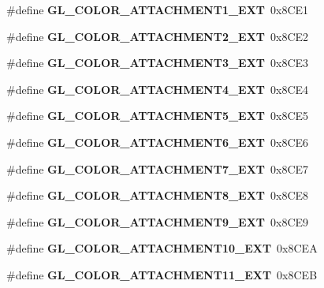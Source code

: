 \begin{DoxyCompactItemize}
\item 
\#define {\bfseries G\+L\+\_\+\+C\+O\+L\+O\+R\+\_\+\+A\+T\+T\+A\+C\+H\+M\+E\+N\+T1\+\_\+\+E\+X\+T}~0x8\+C\+E1\label{_s_d_l__opengl_8h_abb41a580a48b0db9ab09bd666b197c38}

\item 
\#define {\bfseries G\+L\+\_\+\+C\+O\+L\+O\+R\+\_\+\+A\+T\+T\+A\+C\+H\+M\+E\+N\+T2\+\_\+\+E\+X\+T}~0x8\+C\+E2\label{_s_d_l__opengl_8h_ae095e9224b140740da4120b4df6ee383}

\item 
\#define {\bfseries G\+L\+\_\+\+C\+O\+L\+O\+R\+\_\+\+A\+T\+T\+A\+C\+H\+M\+E\+N\+T3\+\_\+\+E\+X\+T}~0x8\+C\+E3\label{_s_d_l__opengl_8h_a5e1b0f6369ed1fec16d1a6a30f27b3e8}

\item 
\#define {\bfseries G\+L\+\_\+\+C\+O\+L\+O\+R\+\_\+\+A\+T\+T\+A\+C\+H\+M\+E\+N\+T4\+\_\+\+E\+X\+T}~0x8\+C\+E4\label{_s_d_l__opengl_8h_af6d67cab75dc9104ce5d26351a8df930}

\item 
\#define {\bfseries G\+L\+\_\+\+C\+O\+L\+O\+R\+\_\+\+A\+T\+T\+A\+C\+H\+M\+E\+N\+T5\+\_\+\+E\+X\+T}~0x8\+C\+E5\label{_s_d_l__opengl_8h_ab6cf2e09b26e4c491520a6ab2db51a25}

\item 
\#define {\bfseries G\+L\+\_\+\+C\+O\+L\+O\+R\+\_\+\+A\+T\+T\+A\+C\+H\+M\+E\+N\+T6\+\_\+\+E\+X\+T}~0x8\+C\+E6\label{_s_d_l__opengl_8h_a57887f8f8eb2e0d40123a5be0d6618a2}

\item 
\#define {\bfseries G\+L\+\_\+\+C\+O\+L\+O\+R\+\_\+\+A\+T\+T\+A\+C\+H\+M\+E\+N\+T7\+\_\+\+E\+X\+T}~0x8\+C\+E7\label{_s_d_l__opengl_8h_ab540eeec29302c91687ccd26bbd6376e}

\item 
\#define {\bfseries G\+L\+\_\+\+C\+O\+L\+O\+R\+\_\+\+A\+T\+T\+A\+C\+H\+M\+E\+N\+T8\+\_\+\+E\+X\+T}~0x8\+C\+E8\label{_s_d_l__opengl_8h_a261067b4aa6b8948178607a586a86fe5}

\item 
\#define {\bfseries G\+L\+\_\+\+C\+O\+L\+O\+R\+\_\+\+A\+T\+T\+A\+C\+H\+M\+E\+N\+T9\+\_\+\+E\+X\+T}~0x8\+C\+E9\label{_s_d_l__opengl_8h_a96ce593a2ce620f5481621c8e556d3dd}

\item 
\#define {\bfseries G\+L\+\_\+\+C\+O\+L\+O\+R\+\_\+\+A\+T\+T\+A\+C\+H\+M\+E\+N\+T10\+\_\+\+E\+X\+T}~0x8\+C\+E\+A\label{_s_d_l__opengl_8h_a09fa29bdcf12849a2f31b43743e393bf}

\item 
\#define {\bfseries G\+L\+\_\+\+C\+O\+L\+O\+R\+\_\+\+A\+T\+T\+A\+C\+H\+M\+E\+N\+T11\+\_\+\+E\+X\+T}~0x8\+C\+E\+B\label{_s_d_l__opengl_8h_a7e0548e31a67349325353584ff33c681}


\end{DoxyCompactItemize}

